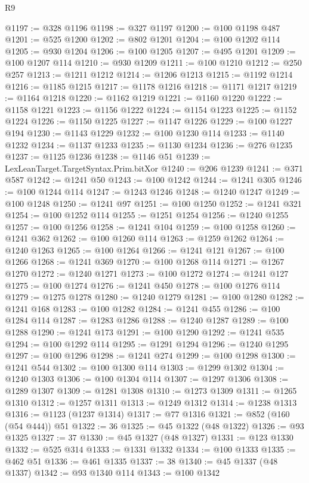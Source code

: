 \begin{lexlean}{R9}
\begin{coremodule}
@1197 := @328 @1196
@1198 := @327 @1197
@1200 := @100 @1198 @487
@1201 := @525 @1200
@1202 := @802 @1201
@1204 := @100 @1202 @114
@1205 := @930 @1204
@1206 := @100 @1205
@1207 := @495 @1201
@1209 := @100 @1207 @114
@1210 := @930 @1209
@1211 := @100 @1210
@1212 := @250 @257
@1213 := @1211 @1212
@1214 := @1206 @1213
@1215 := @1192 @1214
@1216 := @1185 @1215
@1217 := @1178 @1216
@1218 := @1171 @1217
@1219 := @1164 @1218
@1220 := @1162 @1219
@1221 := @1160 @1220
@1222 := @1158 @1221
@1223 := @1156 @1222
@1224 := @1154 @1223
@1225 := @1152 @1224
@1226 := @1150 @1225
@1227 := @1147 @1226
@1229 := @100 @1227 @194
@1230 := @1143 @1229
@1232 := @100 @1230 @114
@1233 := @1140 @1232
@1234 := @1137 @1233
@1235 := @1130 @1234
@1236 := @276 @1235
@1237 := @1125 @1236
@1238 := @1146 @51
@1239 := LexLeanTarget.TargetSyntax.Prim.bitXor
@1240 := @206 @1239
@1241 := @371 @587
@1242 := @1241 @50
@1243 := @100 @1242
@1244 := @1241 @305
@1246 := @100 @1244 @114
@1247 := @1243 @1246
@1248 := @1240 @1247
@1249 := @100 @1248
@1250 := @1241 @97
@1251 := @100 @1250
@1252 := @1241 @321
@1254 := @100 @1252 @114
@1255 := @1251 @1254
@1256 := @1240 @1255
@1257 := @100 @1256
@1258 := @1241 @104
@1259 := @100 @1258
@1260 := @1241 @362
@1262 := @100 @1260 @114
@1263 := @1259 @1262
@1264 := @1240 @1263
@1265 := @100 @1264
@1266 := @1241 @121
@1267 := @100 @1266
@1268 := @1241 @369
@1270 := @100 @1268 @114
@1271 := @1267 @1270
@1272 := @1240 @1271
@1273 := @100 @1272
@1274 := @1241 @127
@1275 := @100 @1274
@1276 := @1241 @450
@1278 := @100 @1276 @114
@1279 := @1275 @1278
@1280 := @1240 @1279
@1281 := @100 @1280
@1282 := @1241 @168
@1283 := @100 @1282
@1284 := @1241 @455
@1286 := @100 @1284 @114
@1287 := @1283 @1286
@1288 := @1240 @1287
@1289 := @100 @1288
@1290 := @1241 @173
@1291 := @100 @1290
@1292 := @1241 @535
@1294 := @100 @1292 @114
@1295 := @1291 @1294
@1296 := @1240 @1295
@1297 := @100 @1296
@1298 := @1241 @274
@1299 := @100 @1298
@1300 := @1241 @544
@1302 := @100 @1300 @114
@1303 := @1299 @1302
@1304 := @1240 @1303
@1306 := @100 @1304 @114
@1307 := @1297 @1306
@1308 := @1289 @1307
@1309 := @1281 @1308
@1310 := @1273 @1309
@1311 := @1265 @1310
@1312 := @1257 @1311
@1313 := @1249 @1312
@1314 := @1238 @1313
@1316 := @1123 (@1237 @1314)
@1317 := @77 @1316
@1321 := @852 (@160 (@54 @444)) @51
@1322 := 36
@1325 := @45 @1322 (@48 @1322)
@1326 := @93 @1325
@1327 := 37
@1330 := @45 @1327 (@48 @1327)
@1331 := @123 @1330
@1332 := @525 @314
@1333 := @1331 @1332
@1334 := @100 @1333
@1335 := @462 @51
@1336 := @461 @1335
@1337 := 38
@1340 := @45 @1337 (@48 @1337)
@1342 := @93 @1340 @114
@1343 := @100 @1342

\end{coremodule}
\end{lexlean}
